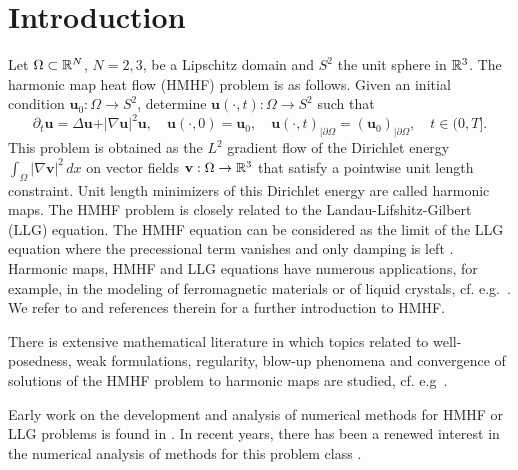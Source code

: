 \documentclass{siamltex}
\newcommand{\bu}{\mathbf u}
\newcommand{\bv}{\mathbf v}
\begin{document}
\section{Introduction}
Let $\Omega \subset \Bbb{R}^N$, $N=2,3$,  be a Lipschitz domain and $S^2$ the unit sphere in $\Bbb{R}^3$. The harmonic  map heat flow (HMHF) problem is as follows. Given an initial condition $\bu_0: \Omega \to S^2$, determine $\bu(\cdot,t): \Omega \to S^2$ such that
\begin{equation} \label{HMHFeq}
 \partial_t\mathbf{u}= \Delta \mathbf{u} + \rvert \nabla \mathbf{u} \lvert^2 \mathbf{u}, \quad \bu(\cdot,0)= \bu_0, \quad \bu(\cdot,t)_{|\partial \Omega}=(\bu_0)_{|\partial \Omega}, \quad t \in (0,T]. 
\end{equation}
This problem is obtained as the $L^2$ gradient flow of the Dirichlet energy $\int_\Omega |\nabla \bv|^2 \, dx$ on vector fields $\bv: \Omega \to \Bbb{R}^3$ that satisfy a pointwise unit length constraint. Unit length minimizers of this Dirichlet energy are called harmonic maps.  The HMHF problem is  closely related to the Landau-Lifshitz-Gilbert (LLG) equation. The HMHF equation can be considered as the limit of the LLG equation where the precessional term vanishes and only damping is left \cite{Melcher2011}. 
Harmonic maps, HMHF and LLG equations have numerous  applications, for example, in the modeling of ferromagnetic materials or of liquid crystals, cf. e.g.~\cite{Lakshmanan2011,LiuLi2013Skyr,prohl2001,Heinze2011}.
We refer to \cite[Chapter III, Section 6]{Struwe08} and references therein for a further introduction to HMHF.


There is extensive mathematical literature in which topics related to well-posedness, weak formulations, regularity, blow-up phenomena and convergence of solutions of the HMHF problem to harmonic maps are studied, cf. e.g~\cite{Struwe85,Struwe08,Eells1964HarmonicMO,Hamilton1975HarmonicMO,KCChang89,Freire95,ChangDingYe1992,vandHout2001}.
 
 Early work on the development and analysis of numerical methods for HMHF or LLG problems is found in \cite{BarPro06,BaLuPr09,prohl2001,BartelsProhl2007,Alouges2008FEMLL, AlougesJaisson06}. In recent years, there has been a renewed interest in the numerical analysis of methods for this problem class \cite{KovacsLuebich,BaKoWa22,Gui22,BBPS24}.
 
\end{document}
